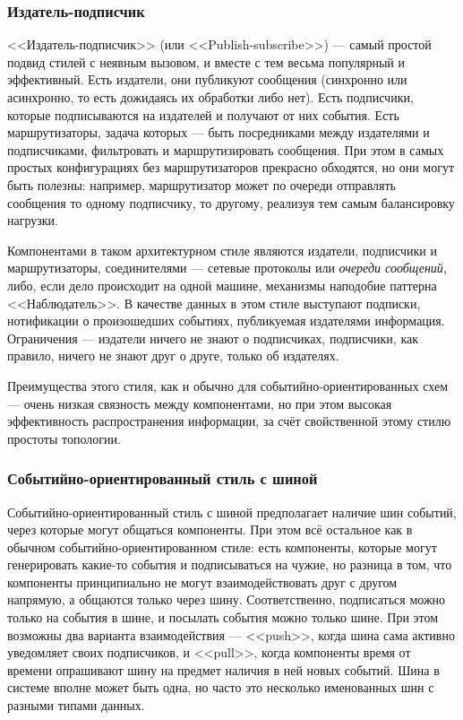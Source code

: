 \documentclass[a5paper]{article}
\begin{document}
\subsubsection{Издатель-подписчик}

<<Издатель-подписчик>> (или <<Publish-subscribe>>) --- самый простой подвид стилей с неявным вызовом, и вместе с тем весьма популярный и эффективный. Есть издатели, они публикуют сообщения (синхронно или асинхронно, то есть дожидаясь их обработки либо нет). Есть подписчики, которые подписываются на издателей и получают от них события. Есть маршрутизаторы, задача которых --- быть посредниками между издателями и подписчиками, фильтровать и маршрутизировать сообщения. При этом в самых простых конфигурациях без маршрутизаторов прекрасно обходятся, но они могут быть полезны: например, маршрутизатор может по очереди отправлять сообщения то одному подписчику, то другому, реализуя тем самым балансировку нагрузки.

Компонентами в таком архитектурном стиле являются издатели, подписчики и маршрутизаторы, соединителями --- сетевые протоколы или \textit{очереди сообщений}, либо, если дело происходит на одной машине, механизмы наподобие паттерна <<Наблюдатель>>. В качестве данных в этом стиле выступают подписки, нотификации о произошедших событиях, публикуемая издателями информация. Ограничения --- издатели ничего не знают о подписчиках, подписчики, как правило, ничего не знают друг о друге, только об издателях.

Преимущества этого стиля, как и обычно для событийно-ориентированных схем --- очень низкая связность между компонентами, но при этом высокая эффективность распространения информации, за счёт свойственной этому стилю простоты топологии.

\subsubsection{Событийно-ориентированный стиль с шиной}

Событийно-ориентированный стиль с шиной предполагает наличие шин событий, через которые могут общаться компоненты. При этом всё остальное как в обычном событийно-ориентированном стиле: есть компоненты, которые могут генерировать какие-то события и подписываться на чужие, но разница в том, что компоненты принципиально не могут взаимодействовать друг с другом напрямую, а общаются только через шину. Соответственно, подписаться можно только на события в шине, и посылать события можно только шине. При этом возможны два варианта взаимодействия --- <<push>>, когда шина сама активно уведомляет своих подписчиков, и <<pull>>, когда компоненты время от времени опрашивают шину на предмет наличия в ней новых событий. Шина в системе вполне может быть одна, но часто это несколько именованных шин с разными типами данных.
\end{document}
